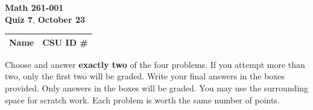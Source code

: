 \documentclass[12pt]{exam}
\newcommand{\class}{Math 261-001}
\newcommand{\examnum}{Quiz 7}
\newcommand{\examdate}{October 23}
\begin{document}
\pagestyle{plain}
\thispagestyle{empty}

\noindent
\textbf{\class}\\
\textbf{\examnum}, \textbf{\examdate}

\setlength{\tabcolsep}{3.5cm}
\renewcommand{\arraystretch}{1.5}
\setlength\extrarowheight{1cm}
\begin{tabular}{ |c|c| }
 \hline
 Name   & CSU ID \#  \\
 \hline
\end{tabular}

\vspace{10pt}

Choose and answer \textbf{exactly two} of the four problems. If you attempt
more than two, only the first two will be graded. Write your final answers
in the boxes provided. Only answers in the boxes will be graded.
You may use the surrounding space for scratch work. Each problem is worth
the same number of points.
\end{document}
